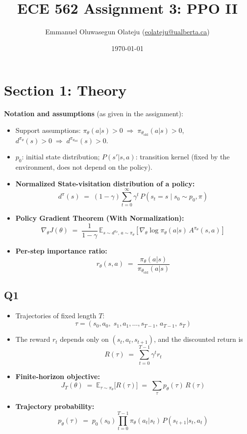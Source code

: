 \documentclass[11pt]{article}
\title{ECE 562 Assignment 3: PPO II\\[2pt]}
\author{Emmanuel Oluwasegun Olateju (\href{mailto:eolateju@ualberta.ca}{eolateju@ualberta.ca})}
\date{\today}
\newcommand{\piold}{\pi_{\theta_{\mathrm{old}}}}
\newcommand{\E}{\mathbb{E}}
\begin{document}
\maketitle

\section*{Section 1: Theory}
\textbf{Notation and assumptions} (as given in the assignment):
\begin{itemize}
  \item Support assumptions:
        $\pi_\theta(a|s) > 0 \;\Rightarrow\; \piold(a|s) > 0$, \quad
        $d^{\pi_\theta}(s) > 0 \;\Rightarrow\; d^{\piold}(s) > 0$.

  \item $p_0$: initial state distribution; \quad
        $P(s'|s,a)$: transition kernel (fixed by the environment, does not depend on the policy).

  \item \textbf{Normalized State-visitation distribution of a policy:}
        \[
          d^{\pi}(s) \;=\; (1-\gamma)\sum_{t=0}^{\infty} \gamma^t \, P(s_t = s \mid s_0 \sim p_0, \pi)
        \]

  \item \textbf{Policy Gradient Theorem (With Normalization):}
        \[
          \nabla_\theta J(\theta) \;=\; \frac{1}{1-\gamma}\,
          \E_{s \sim d^{\pi_\theta},\, a \sim \pi_{\theta}}
          \!\left[\nabla_\theta \log \pi_\theta(a|s)\, A^{\pi_\theta}(s,a)\right]
        \]

  \item \textbf{Per-step importance ratio:}
        \[
          r_\theta(s,a) \;=\; \frac{\pi_\theta(a|s)}{\piold(a|s)}
        \]
\end{itemize}


\subsection*{Q1}
\begin{itemize}
  \item Trajectories of fixed length $T$:
        \[
          \tau = (s_0, a_0,\; s_1, a_1, \ldots, s_{T-1},\, a_{T-1},\, s_T)
        \]
  \item The reward $r_t$ depends only on $(s_t, a_t, s_{t+1})$, and the discounted return is
        \[
          R(\tau) \;=\; \sum_{t=0}^{T-1} \gamma^t r_t
        \]

  \item \textbf{Finite-horizon objective:}
        \[
          J_T(\theta) \;=\; \E_{\tau \sim \pi_\theta}\!\bigl[R(\tau)\bigr]
          \;=\; \sum_\tau p_\theta(\tau)\,R(\tau)
        \]

  \item \textbf{Trajectory probability:}
        \[
          p_\theta(\tau) \;=\; p_0(s_0)\prod_{t=0}^{T-1} \pi_\theta(a_t|s_t)\,P(s_{t+1}|s_t, a_t)
        \]
\end{itemize}
\end{document}
